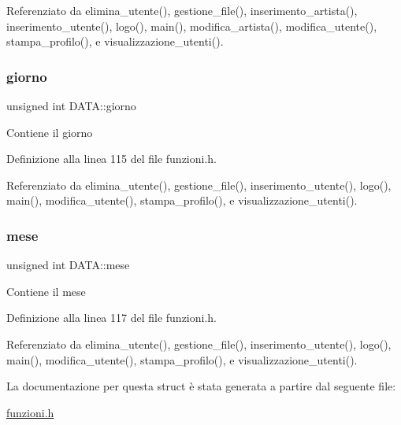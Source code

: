 Referenziato da elimina\+\_\+utente(), gestione\+\_\+file(), inserimento\+\_\+artista(), inserimento\+\_\+utente(), logo(), main(), modifica\+\_\+artista(), modifica\+\_\+utente(), stampa\+\_\+profilo(), e visualizzazione\+\_\+utenti().

\mbox{\label{struct_d_a_t_a_a5b7ee538f851d6654690c7abd5a73e95}} 
\subsubsection{\texorpdfstring{giorno}{giorno}}
{\footnotesize\ttfamily unsigned int D\+A\+T\+A\+::giorno}

Contiene il giorno 

Definizione alla linea 115 del file funzioni.\+h.



Referenziato da elimina\+\_\+utente(), gestione\+\_\+file(), inserimento\+\_\+utente(), logo(), main(), modifica\+\_\+utente(), stampa\+\_\+profilo(), e visualizzazione\+\_\+utenti().

\mbox{\label{struct_d_a_t_a_a01ae59e2eaf050acfab59d94732ab535}} 
\subsubsection{\texorpdfstring{mese}{mese}}
{\footnotesize\ttfamily unsigned int D\+A\+T\+A\+::mese}

Contiene il mese 

Definizione alla linea 117 del file funzioni.\+h.



Referenziato da elimina\+\_\+utente(), gestione\+\_\+file(), inserimento\+\_\+utente(), logo(), main(), modifica\+\_\+utente(), stampa\+\_\+profilo(), e visualizzazione\+\_\+utenti().



La documentazione per questa struct è stata generata a partire dal seguente file\+:\begin{DoxyCompactItemize}
\item 
\hyperlink{funzioni_8h}{funzioni.\+h}\end{DoxyCompactItemize}
